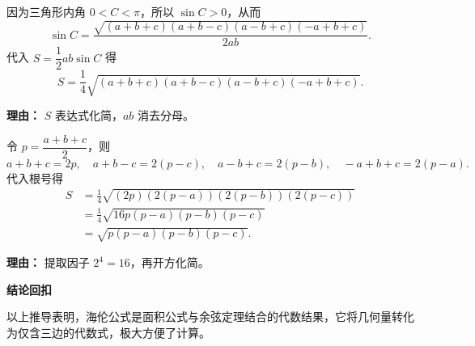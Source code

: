 \begin{proofbox}
\begin{description}[style=nextline, leftmargin=2.8em, labelsep=0.5em, itemsep=0.55em]
		\item[\textbf{步骤五（代入面积）：}]
		      因为三角形内角 $0<C<\pi$，所以 $\sin C>0$，从而
		      \[
			      \sin C = \frac{\sqrt{(a+b+c)(a+b-c)(a-b+c)(-a+b+c)}}{2ab}.
		      \]
		      代入 $S = \dfrac12 ab\sin C$ 得
		      \[
			      S = \frac14 \sqrt{(a+b+c)(a+b-c)(a-b+c)(-a+b+c)}.
		      \]
		      \par\textbf{理由：} $S$ 表达式化简，$ab$ 消去分母。

		\item[\textbf{步骤六（引入半周长）：}]
		      令 $p = \dfrac{a+b+c}{2}$，则
		      \[
			      a+b+c = 2p,
			      \quad a+b-c = 2(p-c),
			      \quad a-b+c = 2(p-b),
			      \quad -a+b+c = 2(p-a).
		      \]
		      代入根号得
		      \[
			      \begin{aligned}
				      S
				       & = \frac14 \sqrt{(2p)(2(p-a))(2(p-b))(2(p-c))} \\
				       & = \frac14 \sqrt{16p(p-a)(p-b)(p-c)}           \\
				       & = \sqrt{p(p-a)(p-b)(p-c)}.
			      \end{aligned}
		      \]
		      \par\textbf{理由：} 提取因子 $2^4=16$，再开方化简。
	\end{description}

	\medskip
	\textbf{\textcolor{CProof}{结论回扣}}

	以上推导表明，海伦公式是面积公式与余弦定理结合的代数结果，它将几何量转化为仅含三边的代数式，极大方便了计算。
\end{proofbox}